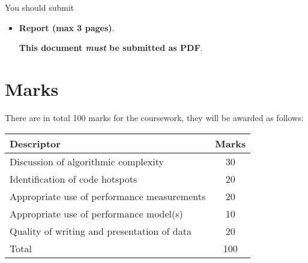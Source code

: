 \documentclass[a4paper]{article}
\begin{document}
You should submit
\begin{itemize}
\item \textbf{Report (max 3 pages)}.

  \textbf{This document \emph{must} be submitted as PDF}.
\end{itemize}

\section{Marks}
\label{sec:marks}

There are in total 100 marks for the coursework, they
will be awarded as follows:

\begin{center}
  \renewcommand\tabularxcolumn[1]{m{#1}}
  \begin{tabularx}{0.9\linewidth}{Xc}
    \toprule
    Descriptor                                                  & Marks \\
    \midrule
    Discussion of algorithmic complexity                        & 30    \\
    Identification of code hotspots                             & 20    \\
    Appropriate use of performance measurements                 & 20    \\
    Appropriate use of performance model(s)                     & 10    \\
    \midrule
    Quality of writing and presentation of data                 & 20    \\
    \midrule
    Total                                                       & 100   \\
    \bottomrule
  \end{tabularx}
\end{center}
\end{document}
